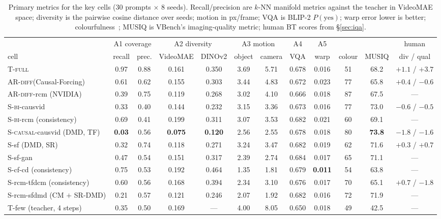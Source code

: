 \documentclass[10pt,twocolumn,letterpaper]{article}
\newcommand{\Tfull}{\textsc{T-full}}\newcommand{\ARdiff}{\textsc{AR-diff}}
\newcommand{\Sbi}{\textsc{S-bi}}\newcommand{\Scausal}{\textsc{S-causal}}
\begin{document}
\begin{table}[t]\centering\footnotesize\setlength{\tabcolsep}{4pt}
\caption{Primary metrics for the key cells (30 prompts $\times$ 8 seeds). Recall/precision are $k$-NN manifold metrics against the teacher in VideoMAE space; diversity is the pairwise cosine distance over seeds; motion in px/frame; VQA is BLIP-2 $P(\text{yes})$; warp error lower is better; colourfulness~\cite{hasler}; MUSIQ is VBench's imaging-quality metric; human BT scores from \S\ref{sec:iqa}.}\label{tab:main}
\begin{tabular}{@{}lccccccccccc@{}}\toprule
 & \multicolumn{2}{c}{A1 coverage} & \multicolumn{2}{c}{A2 diversity} & \multicolumn{2}{c}{A3 motion} & A4 & A5 & & & human \\
cell & recall & prec. & VideoMAE & DINOv2 & object & camera & VQA & warp & colour & MUSIQ & div / qual \\\midrule
\Tfull & 0.97 & 0.88 & 0.161 & 0.350 & 3.69 & 5.71 & 0.678 & 0.016 & 51 & 68.2 & $+1.1$ / $+3.7$ \\
\ARdiff (Causal-Forcing) & 0.61 & 0.62 & 0.155 & 0.303 & 3.44 & 4.83 & 0.672 & 0.023 & 77 & 65.8 & $+0.4$ / $-0.6$ \\
\ARdiff-rcm (NVIDIA) & 0.39 & 0.75 & 0.119 & 0.268 & 3.02 & 4.10 & 0.666 & 0.018 & 87 & 67.5 & --- \\
\Sbi-causvid & 0.33 & 0.40 & 0.144 & 0.232 & 3.15 & 3.36 & 0.673 & 0.016 & 77 & 73.0 & $-0.6$ / $-0.5$ \\
\Sbi-rcm (consistency) & 0.69 & 0.41 & 0.199 & 0.311 & 3.07 & 3.53 & 0.682 & 0.021 & 60 & 69.1 & --- \\
\Scausal-causvid (DMD, TF) & \textbf{0.03} & 0.56 & \textbf{0.075} & \textbf{0.120} & 2.56 & 2.55 & 0.678 & 0.018 & 80 & \textbf{73.8} & $\mathbf{-1.8}$ / $-1.6$ \\
S-sf (DMD, SR) & 0.32 & 0.74 & 0.118 & 0.271 & 3.24 & 3.47 & 0.682 & 0.019 & 62 & 71.6 & $+0.3$ / $+0.7$ \\
S-sf-gan & 0.47 & 0.54 & 0.151 & 0.317 & 2.39 & 2.74 & 0.684 & 0.017 & 65 & 71.1 & --- \\
S-cf-cd (consistency) & 0.75 & 0.53 & 0.192 & 0.464 & 1.35 & 1.81 & 0.679 & \textbf{0.011} & 54 & 63.8 & --- \\
S-rcm-tfdcm (consistency) & 0.60 & 0.56 & 0.168 & 0.394 & 2.34 & 3.10 & 0.676 & 0.017 & 70 & 65.1 & $+0.7$ / $-1.8$ \\
S-rcm-sfdmd (CM $+$ SR-DMD) & 0.21 & 0.57 & 0.121 & 0.246 & 2.07 & 1.92 & 0.682 & 0.016 & 72 & 71.9 & --- \\
T-few (teacher, 4 steps) & 0.35 & 0.50 & 0.169 & --- & 4.00 & 8.05 & 0.650 & 0.018 & 49 & 42.5 & --- \\\bottomrule
\end{tabular}
\end{table}
\end{document}
